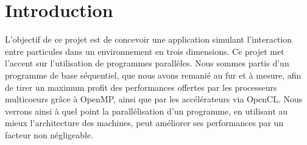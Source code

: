 \section{Introduction}

L'objectif de ce projet est de concevoir une application simulant l'interaction entre particules dans un environnement en trois dimensions.
Ce projet met l'accent sur l'utilisation de programmes parallèles. Nous sommes partis d'un programme de base séquentiel, que nous avons remanié au fur et à mesure, afin de tirer un maximum profit des performances offertes par les processeurs multicoeurs grâce à OpenMP, ainsi que par les accélérateurs via OpenCL. 
Nous verrons ainsi à quel point la parallélisation d'un programme, en utilisant au mieux l'architecture des machines, peut améliorer ses performances par un facteur non négligeable.